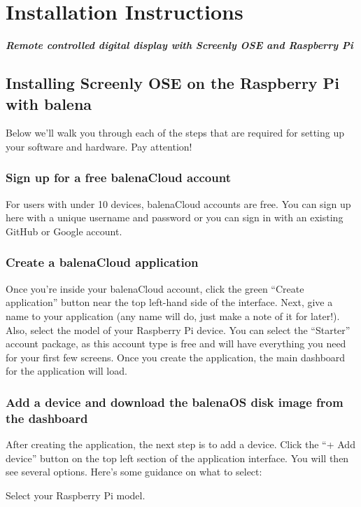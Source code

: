 \chapter{Installation Instructions}
\textbf{\textit{Remote controlled digital display with Screenly OSE and Raspberry Pi}}

\section*{Installing Screenly OSE on the Raspberry Pi with balena} 

Below we’ll walk you through each of the steps that are required for setting up your software and hardware. Pay attention!
\subsection*{Sign up for a free balenaCloud account}

For users with under 10 devices, balenaCloud accounts are free. You can sign up here with a unique username and password or you can sign in with an existing GitHub or Google account.

\subsection*{Create a balenaCloud application}

Once you’re inside your balenaCloud account, click the green “Create application” button near the top left-hand side of the interface. Next, give a name to your application (any name will do, just make a note of it for later!). Also, select the model of your Raspberry Pi device. You can select the “Starter” account package, as this account type is free and will have everything you need for your first few screens. Once you create the application, the main dashboard for the application will load.

\subsection*{Add a device and download the balenaOS disk image from the dashboard}

After creating the application, the next step is to add a device. Click the “+ Add device” button on the top left section of the application interface. You will then see several options. Here’s some guidance on what to select:

    Select your Raspberry Pi model.

